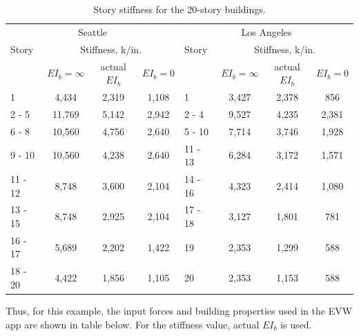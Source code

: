 \documentclass{simcenterdocumentation}
\begin{document}
\begin{table}[H]
	\centering \caption{Story stiffness for the 20-story buildings.}
	\label{tab:stiffness_20LASE}
	\begin{tabular}{lccclccc}
	\toprule
	\multicolumn{4}{c}{Seattle}						& \multicolumn{4}{c}{Los Angeles}				\\ \cmidrule(rl){1-4}\cmidrule(rl){5-8}
	Story	& \multicolumn{3}{c}{Stiffness, k/in.}						& Story		& \multicolumn{3}{c}{Stiffness, k/in.}				\\ \cmidrule(rl){2-4}\cmidrule(rl){6-8}
			& $EI_b = \infty$	& actual $EI_b$		& $EI_b = 0$		& 			& $EI_b = \infty$	& actual $EI_b$		& $EI_b = 0$\\ \cmidrule(rl){1-4}\cmidrule(rl){5-8}
	1 		& 4,434				& 2,319				& 1,108				& 1 		& 3,427				& 2,378				& 856				\\
	2 - 5	& 11,769			& 5,142				& 2,942				& 2 - 4		& 9,527				& 4,235				& 2,381				\\ 
	6 - 8	& 10,560			& 4,756				& 2,640				& 5 - 10	& 7,714				& 3,746				& 1,928				\\ 
	9 - 10	& 10,560			& 4,238				& 2,640				& 11 - 13	& 6,284				& 3,172				& 1,571				\\ 
	11 - 12	& 8,748				& 3,600				& 2,104				& 14 - 16	& 4,323				& 2,414				& 1,080				\\ 
	13 - 15	& 8,748				& 2,925				& 2,104				& 17 - 18	& 3,127				& 1,801				& 781				\\ 
	16 - 17	& 5,689				& 2,202				& 1,422				& 19		& 2,353				& 1,299				& 588				\\ 
	18 - 20	& 4,422				& 1,856				& 1,105				& 20		& 2,353				& 1,153				& 588				\\ \bottomrule
	\end{tabular}
\end{table}


Thus, for this example, the input forces and building properties used in the EVW app are shown in table below. For the stiffness value, actual $EI_b$ is used.
\end{document}
